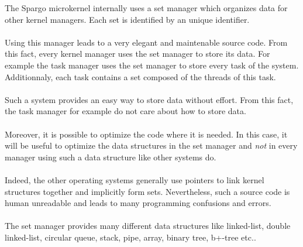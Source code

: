 \documentclass[10pt,a4wide]{article}
\begin{document}
\begin{multicols}{2}
The Spargo microkernel internally uses a set manager which organizes data
for other kernel managers. Each set is identified by an unique identifier.

\paragraph{}

Using this manager leads to a very elegant and maintenable source code. From
this fact, every kernel manager uses the set manager to store its data. For
example the task manager uses the set manager to store every task of the
system. Additionnaly, each task contains a set composed of the threads of
this task.

\paragraph{}

Such a system provides an easy way to store data without effort. From this
fact, the task manager for example do not care about how to store data.

\paragraph{}

Moreover, it is possible to optimize the code where it is needed. In this
case, it will be useful to optimize the data structures in the set manager
and \textit{not} in every manager using such a data structure like
other systems do.

\paragraph{}

Indeed, the other operating systems generally use pointers to link kernel
structures together and implicitly form sets. Nevertheless, such a source code
is human unreadable and leads to many programming confusions and errors.

\paragraph{}

The set manager provides many different data structures like linked-list,
double linked-list, circular queue, stack, pipe, array, binary tree, b+-tree
etc..

\paragraph{}


\end{multicols}
\end{document}
